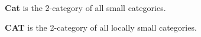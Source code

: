



\begin{defn}[\bf Cat]
    \textbf{Cat}\label{nomencl:Cat} is the 2-category of all small categories.
\end{defn}
\begin{defn}[\bf CAT]
    \textbf{CAT}\label{nomencl:CAT} is the 2-category of all locally small categories.
\end{defn}

